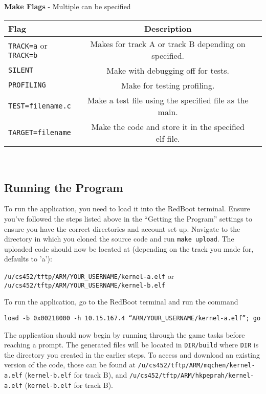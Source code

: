 \documentclass[12pt]{article}
\begin{document}
\begin{center}
  {\bf Make Flags} - Multiple can be specified
  \begin{tabular}{|l|c|c|}
    \hline
    {\bf Flag} & {\bf Description} \\\hline
    \texttt{TRACK=a} or \texttt{TRACK=b} & Makes for track A or track B depending on specified. \\\hline
    \texttt{SILENT} & Make with debugging off for tests. \\\hline
    \texttt{PROFILING} & Make for testing profiling. \\\hline
    \texttt{TEST=filename.c} & Make a test file using the specified file as the main. \\\hline
    \texttt{TARGET=filename} & Make the code and store it in the specified elf file. \\\hline
  \end{tabular}
  \\[1\baselineskip]
\end{center}
\subsection{Running the Program}
To run the application, you need to load it into the RedBoot terminal.  Ensure you've followed the steps listed above in the ``Getting the Program'' settings to ensure you have the correct directories and account set up.  Navigate to the directory in which you cloned the source code and run \texttt{make upload}.  The uploaded code should now be located at (depending on the track you made for, defaults to 'a'):
\begin{center}
  \texttt{/u/cs452/tftp/ARM/YOUR\_USERNAME/kernel-a.elf} or \\
  \texttt{/u/cs452/tftp/ARM/YOUR\_USERNAME/kernel-b.elf}
\end{center}
To run the application, go to the RedBoot terminal and run the command
\begin{center}
  \texttt{load -b 0x00218000 -h 10.15.167.4 ``ARM/YOUR\_USERNAME/kernel-a.elf''; go}
\end{center}
The application should now begin by running through the game tasks before reaching a prompt.  The generated files will be located in \texttt{DIR/build} where \texttt{DIR} is the directory you created in the earlier steps.  To access and download an existing version of the code, those can be found at \texttt{/u/cs452/tftp/ARM/mqchen/kernel-a.elf} (\texttt{kernel-b.elf} for track B), and \texttt{/u/cs452/tftp/ARM/hkpeprah/kernel-a.elf} (\texttt{kernel-b.elf} for track B).
\\
\end{document}
